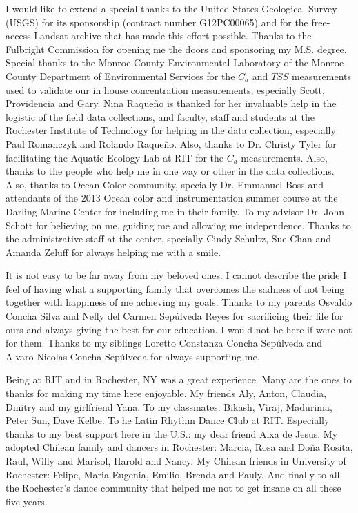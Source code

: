 \documentclass[oneside,11pt,draft]{book}
\let\stdsection\chapter
\renewcommand\chapter{\newpage\stdsection}
\begin{document}
\begin{acknowledgements}
{}
\setlength{\parindent}{20pt}
I would like to extend a special thanks to the United States Geological Survey (USGS) for its sponsorship (contract number G12PC00065) and for the free-access Landsat archive that has made this effort possible. Thanks to the Fulbright Commission for opening me the doors and sponsoring my M.S. degree. Special thanks to the Monroe County Environmental Laboratory of the Monroe County Department of Environmental Services for the $C_a$ and $TSS$ measurements used to validate our in house concentration measurements, especially Scott, Providencia and Gary. Nina Raque\~{n}o is thanked for her invaluable help in the logistic of the field data collections, and faculty, staff and students at the Rochester Institute of Technology for helping in the data collection, especially Paul Romanczyk and Rolando Raque\~{n}o. Also, thanks to Dr. Christy Tyler for facilitating the Aquatic Ecology Lab at RIT for the $C_a$ measurements. Also, thanks to the people who help me in one way or other in the data collections. Also, thanks to Ocean Color community, specially Dr. Emmanuel Boss and attendants of the 2013 Ocean color and instrumentation summer course at the Darling Marine Center for including me in their family. To my advisor Dr. John Schott for believing on me, guiding me and allowing me independence. Thanks to the administrative staff at the center, specially Cindy Schultz, Sue Chan and Amanda Zeluff for always helping me with a smile.

It is not easy to be far away from my beloved ones. I cannot describe the pride I feel of having what a supporting family that overcomes the sadness of not being together with happiness of me achieving my goals. Thanks to my parents Osvaldo Concha Silva and Nelly del Carmen Sep\'ulveda Reyes for sacrificing their life for ours and always giving the best for our education. I would not be here if were not for them. Thanks to my siblings Loretto Constanza Concha Sep\'ulveda and Alvaro Nicolas Concha Sep\'ulveda for always supporting me.

Being at RIT and in Rochester, NY was a great experience. Many are the ones to thanks for making my time here enjoyable. My friends Aly, Anton, Claudia, Dmitry and my girlfriend Yana. To my classmates: Bikash, Viraj, Madurima, Peter Sun, Dave Kelbe. To he Latin Rhythm Dance Club at RIT. Especially thanks to my best support here in the U.S.: my dear friend Aixa de Jesus. My adopted Chilean family and dancers in Rochester: Marcia, Rosa and Doña Rosita, Raul, Willy and Marisol, Harold and Nancy. My Chilean friends in University of Rochester: Felipe, Maria Eugenia, Emilio, Brenda and Pauly. And finally to all the Rochester's dance community that helped me not to get insane on all these five years.
\end{acknowledgements}
\end{document}
